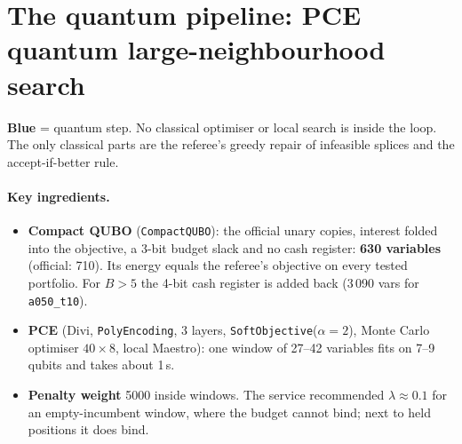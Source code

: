\documentclass[11pt]{article}
\begin{document}
\section{The quantum pipeline: PCE quantum large-neighbourhood search}
\begin{center}
\end{center}
\noindent\textcolor{arc}{\textbf{Blue}} = quantum step. No classical optimiser or local search is
inside the loop. The only classical parts are the referee's greedy repair of infeasible splices and the
accept-if-better rule.

\paragraph{Key ingredients.}
\begin{itemize}
\item \textbf{Compact QUBO} (\texttt{CompactQUBO}): the official unary copies, interest folded into the objective, a
  3-bit budget slack and no cash register: \textbf{630 variables} (official: 710). Its energy equals the referee's
  objective on every tested portfolio. For $B>5$ the 4-bit cash register is added back (3\,090 vars for
  \texttt{a050\_t10}).
\item \textbf{PCE} (Divi, \texttt{PolyEncoding}, 3 layers, \texttt{SoftObjective}($\alpha{=}2$),
  Monte Carlo optimiser $40\times8$, local Maestro): one window of 27--42 variables fits on 7--9 qubits and
  takes about 1\,s.
\item \textbf{Penalty weight} 5000 inside windows. The service recommended $\lambda\approx0.1$ for an
  empty-incumbent window, where the budget cannot bind; next to held positions it does bind.
\end{itemize}
\end{document}
